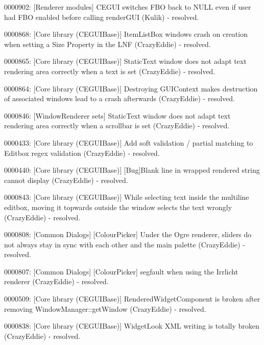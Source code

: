 \begin{DoxyItemize}
\item 0000902\+: \mbox{[}Renderer modules\mbox{]} C\+E\+G\+UI switches F\+BO back to N\+U\+LL even if user had F\+BO enabled before calling render\+G\+UI (Kulik) -\/ resolved.
\item 0000868\+: \mbox{[}Core library (C\+E\+G\+U\+I\+Base)\mbox{]} Item\+List\+Box windows crash on creation when setting a Size Property in the L\+NF (Crazy\+Eddie) -\/ resolved.
\item 0000865\+: \mbox{[}Core library (C\+E\+G\+U\+I\+Base)\mbox{]} Static\+Text window does not adapt text rendering area correctly when a text is set (Crazy\+Eddie) -\/ resolved.
\item 0000864\+: \mbox{[}Core library (C\+E\+G\+U\+I\+Base)\mbox{]} Destroying G\+U\+I\+Context makes destruction of associated windows lead to a crash afterwards (Crazy\+Eddie) -\/ resolved.
\item 0000846\+: \mbox{[}Window\+Renderer sets\mbox{]} Static\+Text window does not adapt text rendering area correctly when a scrollbar is set (Crazy\+Eddie) -\/ resolved.
\item 0000433\+: \mbox{[}Core library (C\+E\+G\+U\+I\+Base)\mbox{]} Add \textquotesingle{}soft validation\textquotesingle{} / partial matching to Editbox regex validation (Crazy\+Eddie) -\/ resolved.
\item 0000440\+: \mbox{[}Core library (C\+E\+G\+U\+I\+Base)\mbox{]} \mbox{[}Bug\mbox{]}Blank line in wrapped rendered string cannot display (Crazy\+Eddie) -\/ resolved.
\item 0000843\+: \mbox{[}Core library (C\+E\+G\+U\+I\+Base)\mbox{]} While selecting text inside the multiline editbox, moving it topwards outside the window selects the text wrongly (Crazy\+Eddie) -\/ resolved.
\item 0000808\+: \mbox{[}Common Dialogs\mbox{]} \mbox{[}Colour\+Picker\mbox{]} Under the Ogre renderer, sliders do not always stay in sync with each other and the main palette (Crazy\+Eddie) -\/ resolved.
\item 0000807\+: \mbox{[}Common Dialogs\mbox{]} \mbox{[}Colour\+Picker\mbox{]} segfault when using the Irrlicht renderer (Crazy\+Eddie) -\/ resolved.
\item 0000509\+: \mbox{[}Core library (C\+E\+G\+U\+I\+Base)\mbox{]} Rendered\+Widget\+Component is broken after removing Window\+Manager\+::get\+Window (Crazy\+Eddie) -\/ resolved.
\item 0000838\+: \mbox{[}Core library (C\+E\+G\+U\+I\+Base)\mbox{]} Widget\+Look X\+ML writing is totally broken (Crazy\+Eddie) -\/ resolved.

\end{DoxyItemize}
